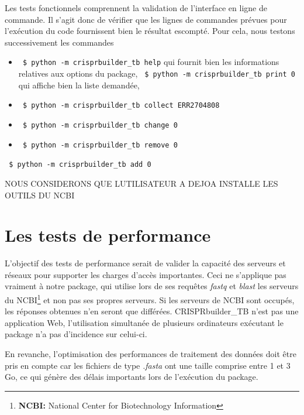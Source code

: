 \documentclass[twoside,a4paper,11pt,frenchb,openany]{report}
\begin{document}
Les tests fonctionnels comprennent la validation de l'interface en ligne de commande. Il s'agit donc de vérifier que les lignes de commandes prévues pour l'exécution du code fournissent bien le résultat escompté. Pour cela, nous testons successivement les commandes

\begin{itemize}
\item \texttt{  \$ python -m crisprbuilder\_tb \textemdash \textemdash help} qui fournit bien les informations relatives aux options du package,
\texttt{  \$ python -m crisprbuilder\_tb \textemdash \textemdash print 0} qui affiche bien la liste demandée,
\item \texttt{  \$ python -m crisprbuilder\_tb \textemdash \textemdash collect ERR2704808}
\item \texttt{  \$ python -m crisprbuilder\_tb \textemdash \textemdash change 0}
\item \texttt{  \$ python -m crisprbuilder\_tb \textemdash \textemdash remove 0}
\end{itemize}
\texttt{  \$ python -m crisprbuilder\_tb \textemdash \textemdash add 0}


NOUS CONSIDERONS QUE LUTILISATEUR A DEJOA INSTALLE LES OUTILS DU NCBI








\section{Les tests de performance}

L'objectif des tests de performance serait de valider la capacité des serveurs et réseaux pour supporter les charges d'accès importantes. Ceci ne s'applique pas vraiment à notre package, qui utilise lors de ses requêtes \textit{fastq} et \textit{blast} les serveurs du NCBI\footnote{\textbf{NCBI:} National Center for Biotechnology Information} et non pas ses propres serveurs. Si les serveurs de NCBI sont occupés, les réponses obtenues n'en seront que différées. CRISPRbuilder\_TB n'est pas une application Web, l'utilisation simultanée de plusieurs ordinateurs exécutant le package n'a pas d'incidence sur celui-ci.

En revanche, l'optimisation des performances de traitement des données doit être pris en compte car les fichiers de type \textit{.fasta} ont une taille comprise entre 1 et 3 Go, ce qui génère des délais importants lors de l'exécution du package.
\end{document}
